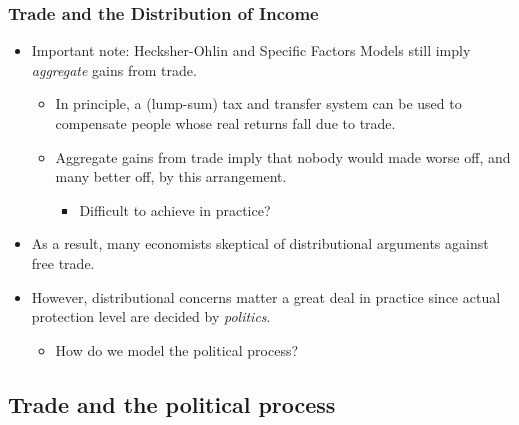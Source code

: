 \documentclass{beamer}
\begin{document}
\begin{frame}
	\frametitle{Trade and the Distribution of Income}

		\begin{itemize}
			\item Important note: Hecksher-Ohlin and Specific Factors Models still imply \emph{aggregate} gains from trade. 
			\begin{itemize}
				\item In principle, a (lump-sum) tax and transfer system can be used to compensate people whose real returns fall due to trade.
				\item Aggregate gains from trade imply that nobody would made worse off, and many better off, by this arrangement.
					\begin{itemize}
						\item Difficult to achieve in practice?
					\end{itemize}
			\end{itemize}
			\item As a result, many economists skeptical of distributional arguments against free trade.
			\item However, distributional concerns matter a great deal in practice since actual protection level are decided by \emph{politics}.
				\begin{itemize}
					\item How do we model the political process?
				\end{itemize}
		\end{itemize}
	
\end{frame}

\subsection{Trade and the political process}
\end{document}
